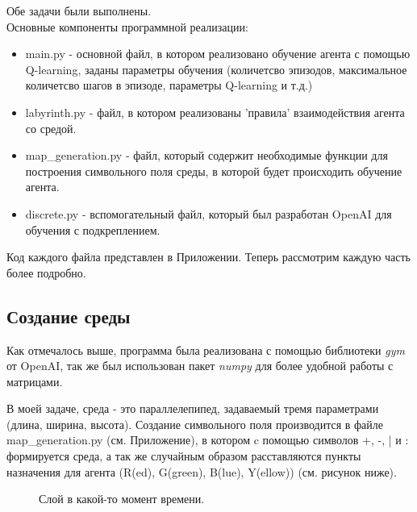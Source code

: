 \documentclass[a4paper]{report}
\theoremstyle{definition}
\theoremstyle{plain}
\theoremstyle{remark}
\theoremstyle{remark}
\theoremstyle{definition}
\begin{document}
Обе задачи были выполнены.\\ 

Основные компоненты программной реализации:
\begin{itemize}
\item main.py - основной файл, в котором реализовано обучение агента с помощью Q-learning, заданы параметры обучения (количетсво эпизодов, максимальное количетсво шагов в эпизоде, параметры Q-learning и т.д.)
\item labyrinth.py - файл, в котором реализованы 'правила' взаимодействия агента со средой.
\item map\_generation.py - файл, который содержит необходимые функции для построения символьного поля среды, в которой будет происходить обучение агента.
\item discrete.py - вспомогательный файл, который был разработан OpenAI для обучения с подкреплением.
 \end{itemize}

Код каждого файла представлен в Приложении.
Теперь рассмотрим каждую часть более подробно.
\begin{center}
    \subsection{Создание среды}
\end{center}

Как отмечалось выше, программа была реализована с помощью библиотеки \textit{gym} от OpenAI, так же был использован пакет \textit{numpy} для более удобной работы с матрицами.

В моей задаче, среда - это параллелепипед, задаваемый тремя параметрами (длина, ширина, высота). Создание символьного поля производится в файле map\_generation.py (см. Приложение), в котором c помощью символов +, -, | и : формируется среда, а так же случайным образом расставляются пункты назначения для агента (R(ed), G(green), B(lue), Y(ellow)) (см. рисунок ниже).
\begin{figure}[H]
	\caption{Слой в какой-то момент времени.}
\end{figure}
\end{document}
